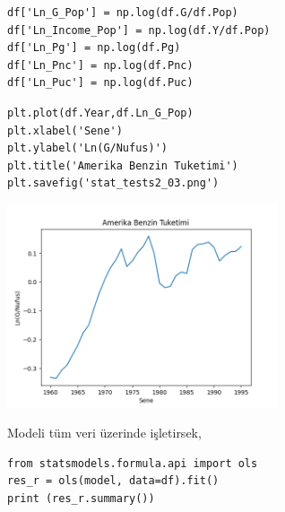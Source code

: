 \documentclass[12pt,fleqn]{article}\usepackage{../../common}
\begin{document}
\begin{verbatim}
df['Ln_G_Pop'] = np.log(df.G/df.Pop)
df['Ln_Income_Pop'] = np.log(df.Y/df.Pop)
df['Ln_Pg'] = np.log(df.Pg)
df['Ln_Pnc'] = np.log(df.Pnc)
df['Ln_Puc'] = np.log(df.Puc)
\end{verbatim}

\begin{verbatim}
plt.plot(df.Year,df.Ln_G_Pop)
plt.xlabel('Sene')
plt.ylabel('Ln(G/Nufus)')
plt.title('Amerika Benzin Tuketimi')
plt.savefig('stat_tests2_03.png')
\end{verbatim}

\includegraphics[height=6cm]{stat_tests2_03.png}

Modeli tüm veri üzerinde işletirsek,

\begin{verbatim}
from statsmodels.formula.api import ols
res_r = ols(model, data=df).fit()
print (res_r.summary())
\end{verbatim}
\end{document}
